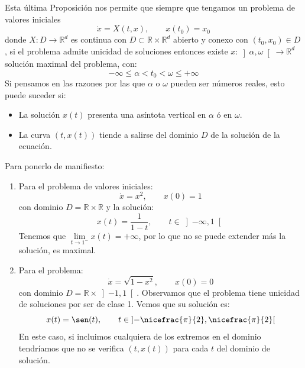 \noindent
Esta última Proposición nos permite que siempre que tengamos un problema de valores iniciales
\begin{equation}\label{eq:problema_cauchy}
    \dot{x} = X(t,x), \qquad x(t_0) = x_0
\end{equation}
donde $X:D\to \mathbb{R}^d$ es continua con $D\subset \mathbb{R}\times\mathbb{R}^d$ abierto y conexo con $(t_0,x_0)\in D$, si el problema admite unicidad de soluciones entonces existe $x:\left]\alpha,\omega\right[\to \mathbb{R}^d$ solución maximal del problema, con:
\begin{equation*}
    -\infty \leq \alpha < t_0<\omega \leq +\infty
\end{equation*}
Si pensamos en las razones por las que $\alpha$ o $\omega$ pueden ser números reales, esto puede suceder si:
\begin{itemize}
    \item La solución $x(t)$ presenta una asíntota vertical en $\alpha$ ó en $\omega$.
    \item La curva $(t,x(t))$ tiende a salirse del dominio $D$ de la solución de la ecuación.
\end{itemize}

\begin{ejemplo}
    Para ponerlo de manifiesto:
    \begin{enumerate}
        \item Para el problema de valores iniciales:
            \begin{equation*}
                \dot{x} = x^2, \qquad x(0) = 1
            \end{equation*}
            con dominio $D=\mathbb{R}\times \mathbb{R}$ y la solución:
            \begin{equation*}
                x(t) = \frac{1}{1-t}, \qquad t\in \left]-\infty,1\right[
            \end{equation*}
            Tenemos que $\lim\limits_{t\to1^-}x(t) = +\infty$, por lo que no se puede extender más la solución, es maximal.
        \item Para el problema:
            \begin{equation*}
                \dot{x} = \sqrt{1-x^2}, \qquad x(0) = 0
            \end{equation*}
            con dominio $D=\mathbb{R}\times \left]-1,1\right[$. Observamos que el problema tiene unicidad de soluciones por ser de clase 1. Vemos que su solución es:
            \begin{equation*}
                x(t) = \sen(t), \qquad t\in \left]-\nicefrac{\pi}{2}, \nicefrac{\pi}{2}\right[
            \end{equation*}
            En este caso, si incluimos cualquiera de los extremos en el dominio tendríamos que no se verifica $(t,x(t))$ para cada $t$ del dominio de solución.
    \end{enumerate}
\end{ejemplo}

